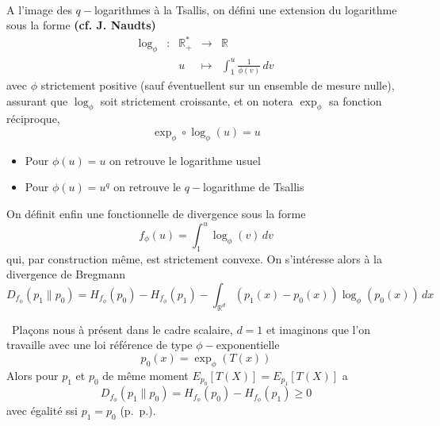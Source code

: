 \documentclass[10pt,a4paper]{article}
\def\Rset{\mathbb{R}}
\begin{document}

\


A  l'image des  $q-$logarithmes \`a  la Tsallis,  on d\'efini  une  extension du
logarithme sous la forme {\bf (cf. J. Naudts)}
%
\begin{equation}
\begin{array}{lcccl}
\log_\phi & : & \Rset_+^* & \to & \Rset\\[2mm]
%
& & u & \mapsto & \displaystyle  \int_1^u \frac{1}{\phi(v)} \, dv
\end{array}
\end{equation}
%
avec $\phi$ strictement positive (sauf  \'eventuellent sur un ensemble de mesure
nulle),  assurant que  $\log_\phi$ soit  strictement croissante,  et  on notera
$\exp_\phi$ sa fonction r\'eciproque,
%
\begin{equation}
\exp_\phi \circ \log_\phi(u) = u
\end{equation}
%
\begin{itemize}
\item Pour $\phi(u) = u$ on retrouve le logarithme usuel
%
\item Pour $\phi(u) = u^q$ on retrouve le $q-$logarithme de Tsallis
\end{itemize}



On d\'efinit enfin une fonctionnelle de divergence sous la forme
%
\begin{equation}
f_\phi(u) = \int_1^u \log_\phi(v) \, dv
\end{equation}
%
qui, par  construction m\^eme, est strictement convexe.   On s'int\'eresse alors
\`a  la  divergence  de  Bregmann  $$D_{f_\phi}(p_1\|p_0)  =  H_{f_\phi}(p_0)  -
H_{f_\phi}(p_1) - \int_{\Rset^d} (p_1(x) - p_0(x)) \log_\phi(p_0(x)) \, dx$$

\ Pla\c{c}ons  nous \`a pr\'esent dans le  cadre scalaire, $d =  1$ et imaginons
que    l'on     travaille    avec     une    loi    r\'ef\'erence     de    type
$\phi-$exponentielle $$p_0(x)  = \exp_\phi(T(x))$$ Alors pour $p_1$  et $p_0$ de
m\^eme  moment  $E_{p_0}[T(X)]   =  E_{p_1}[T(X)]$  a  $$D_{f_\phi}(p_1\|p_0)  =
H_{f_\phi}(p_0)  - H_{f_\phi}(p_1)  \ge 0$$  avec  \'egalit\'e ssi  $p_1 =  p_0$
(p.~p.).
\end{document}
